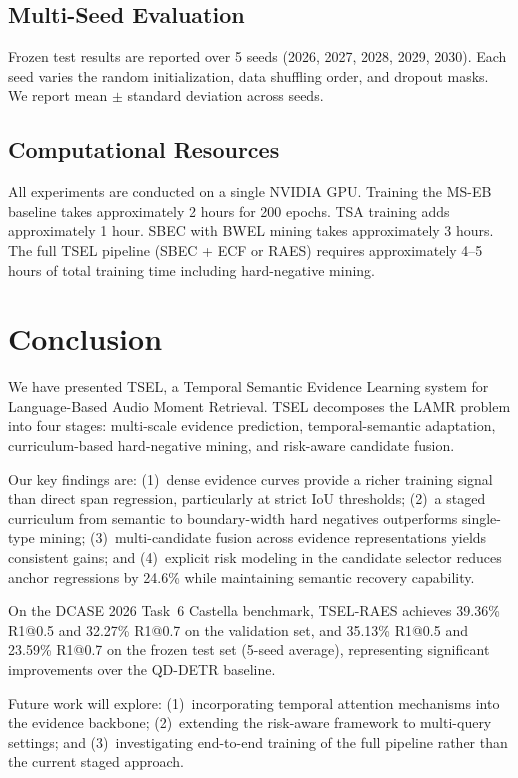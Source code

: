 \documentclass[conference]{IEEEtran}
\begin{document}
\subsection{Multi-Seed Evaluation}
Frozen test results are reported over 5 seeds (2026, 2027, 2028, 2029, 2030).
Each seed varies the random initialization, data shuffling order, and dropout
masks.  We report mean \(\pm\) standard deviation across seeds.

\subsection{Computational Resources}
All experiments are conducted on a single NVIDIA GPU.  Training the MS-EB
baseline takes approximately 2 hours for 200 epochs.  TSA training adds
approximately 1 hour.  SBEC with BWEL mining takes approximately 3 hours.
The full TSEL pipeline (SBEC + ECF or RAES) requires approximately 4--5 hours
of total training time including hard-negative mining.

\section{Conclusion}
\label{sec:conclusion}

We have presented TSEL, a Temporal Semantic Evidence Learning system for
Language-Based Audio Moment Retrieval.  TSEL decomposes the LAMR problem into
four stages: multi-scale evidence prediction, temporal-semantic adaptation,
curriculum-based hard-negative mining, and risk-aware candidate fusion.

Our key findings are: (1)~dense evidence curves provide a richer training signal
than direct span regression, particularly at strict IoU thresholds; (2)~a staged
curriculum from semantic to boundary-width hard negatives outperforms
single-type mining; (3)~multi-candidate fusion across evidence representations
yields consistent gains; and (4)~explicit risk modeling in the candidate
selector reduces anchor regressions by 24.6\% while maintaining semantic
recovery capability.

On the DCASE 2026 Task~6 Castella benchmark, TSEL-RAES achieves 39.36\%
R1@0.5 and 32.27\% R1@0.7 on the validation set, and 35.13\% R1@0.5 and
23.59\% R1@0.7 on the frozen test set (5-seed average), representing
significant improvements over the QD-DETR baseline.

Future work will explore: (1)~incorporating temporal attention mechanisms into
the evidence backbone; (2)~extending the risk-aware framework to multi-query
settings; and (3)~investigating end-to-end training of the full pipeline
rather than the current staged approach.
\end{document}
